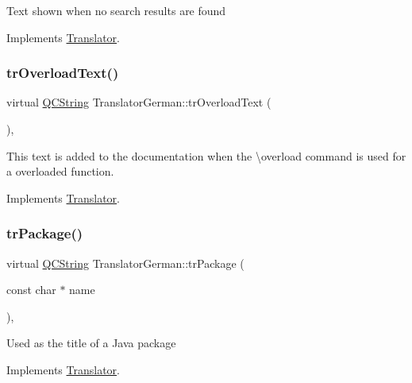 Text shown when no search results are found 

Implements \mbox{\hyperlink{class_translator}{Translator}}.

\mbox{\label{class_translator_german_aeef7e1abd5dd7f5dc69d9e32f0c3b109}} 
\subsubsection{\texorpdfstring{trOverloadText()}{trOverloadText()}}
{\footnotesize\ttfamily virtual \mbox{\hyperlink{class_q_c_string}{Q\+C\+String}} Translator\+German\+::tr\+Overload\+Text (\begin{DoxyParamCaption}{ }\end{DoxyParamCaption})\hspace{0.3cm}{\ttfamily [inline]}, {\ttfamily [virtual]}}

This text is added to the documentation when the \textbackslash{}overload command is used for a overloaded function. 

Implements \mbox{\hyperlink{class_translator}{Translator}}.

\mbox{\label{class_translator_german_a6bbbc46790ddf72833ba91d1562a5fba}} 
\subsubsection{\texorpdfstring{trPackage()}{trPackage()}}
{\footnotesize\ttfamily virtual \mbox{\hyperlink{class_q_c_string}{Q\+C\+String}} Translator\+German\+::tr\+Package (\begin{DoxyParamCaption}\item[{const char $\ast$}]{name }\end{DoxyParamCaption})\hspace{0.3cm}{\ttfamily [inline]}, {\ttfamily [virtual]}}

Used as the title of a Java package 

Implements \mbox{\hyperlink{class_translator}{Translator}}.

\mbox{\label{class_translator_german_a6a8598d22127c6094638e1f7f79deeae}} 
